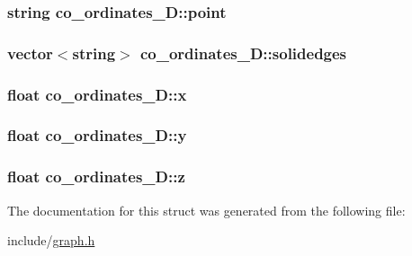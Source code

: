 \subsubsection[{\texorpdfstring{point}{point}}]{\setlength{\rightskip}{0pt plus 5cm}string co\+\_\+ordinates\+\_\+D\+::point}\hypertarget{structco__ordinates__3D_a0c51eac3755997b35253e662676391bc}{}\label{structco__ordinates__3D_a0c51eac3755997b35253e662676391bc}
\subsubsection[{\texorpdfstring{solidedges}{solidedges}}]{\setlength{\rightskip}{0pt plus 5cm}vector$<$string$>$ co\+\_\+ordinates\+\_\+D\+::solidedges}\hypertarget{structco__ordinates__3D_aad059234fd1b769fe491104663a63e77}{}\label{structco__ordinates__3D_aad059234fd1b769fe491104663a63e77}
\subsubsection[{\texorpdfstring{x}{x}}]{\setlength{\rightskip}{0pt plus 5cm}float co\+\_\+ordinates\+\_\+D\+::x}\hypertarget{structco__ordinates__3D_a7fc95a1e0fbe0b7501be1d8e3dcac421}{}\label{structco__ordinates__3D_a7fc95a1e0fbe0b7501be1d8e3dcac421}
\subsubsection[{\texorpdfstring{y}{y}}]{\setlength{\rightskip}{0pt plus 5cm}float co\+\_\+ordinates\+\_\+D\+::y}\hypertarget{structco__ordinates__3D_a9d7588247a3b8e2344d213652ec5636a}{}\label{structco__ordinates__3D_a9d7588247a3b8e2344d213652ec5636a}
\subsubsection[{\texorpdfstring{z}{z}}]{\setlength{\rightskip}{0pt plus 5cm}float co\+\_\+ordinates\+\_\+D\+::z}\hypertarget{structco__ordinates__3D_a900db1bbecab943039799a99ed30428e}{}\label{structco__ordinates__3D_a900db1bbecab943039799a99ed30428e}


The documentation for this struct was generated from the following file\+:\begin{DoxyCompactItemize}
\item 
include/\hyperlink{graph_8h}{graph.\+h}\end{DoxyCompactItemize}
